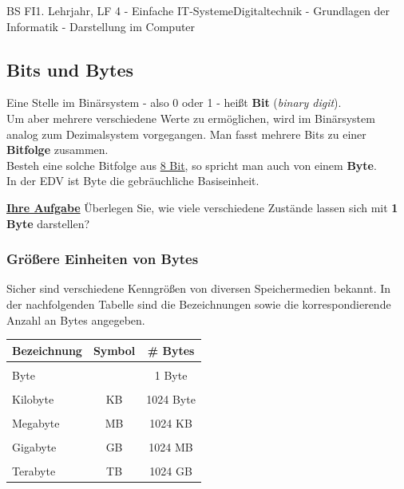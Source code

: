 \documentclass[11pt,twocolumn,oneside,openany,headings=optiontotoc,11pt,numbers=noenddot]{article}
\begin{document}
\begin{worksheet}{BS FI}{1. Lehrjahr, LF 4 - Einfache IT-Systeme}{Digitaltechnik - Grundlagen der Informatik - Darstellung im Computer}
		\subsection*{Bits und Bytes}
		Eine Stelle im Binärsystem - also 0 oder 1 - heißt \textbf{Bit} (\textit{binary digit}).\\
		Um aber mehrere verschiedene Werte zu ermöglichen, wird im Binärsystem analog zum Dezimalsystem vorgegangen. Man fasst mehrere Bits zu einer \textbf{Bitfolge} zusammen.\\
		Besteh eine solche Bitfolge aus \underline{8 Bit}, so spricht man auch von einem \textbf{Byte}.\\
		In der EDV ist Byte die gebräuchliche Basiseinheit.\\
		\par\noindent
		\textbf{\underline{Ihre Aufgabe}} Überlegen Sie, wie viele verschiedene Zustände lassen sich mit \textbf{1 Byte} darstellen?\\
		\subsubsection*{Größere Einheiten von Bytes}
		Sicher sind verschiedene Kenngrößen von diversen Speichermedien bekannt. In der nachfolgenden Tabelle sind die Bezeichnungen sowie die korrespondierende Anzahl an Bytes angegeben.\\
		\begin{tabularx}{0.45\textwidth}{l|c|c}
			\textbf{Bezeichnung} & \textbf{Symbol} & \textbf{\# Bytes}\\
			\hline
			& &\\
			Byte & & 1 Byte\\
			\hline
			& &\\
			Kilobyte & KB & 1024 Byte\\
			\hline
			& &\\
			Megabyte & MB & 1024 KB\\
			\hline
			& &\\
			Gigabyte & GB & 1024 MB\\
			\hline
			& &\\
			Terabyte & TB & 1024 GB\\
			\hline
		\end{tabularx}

\end{worksheet}
\end{document}
